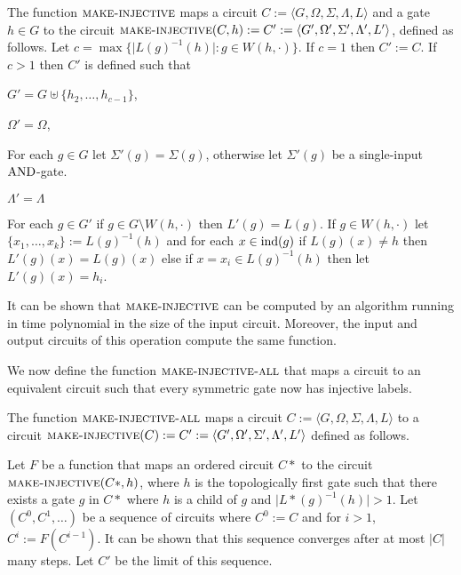 \documentclass[../paper.tex]{subfiles}
\begin{document}
\begin{definition}
  \label{def:make-injective}
  The function ${\normalfont\textsc{make-injective}}$ maps a circuit $C := \langle G, \Omega,
  \Sigma , \Lambda, L \rangle$ and a gate $h \in G$ to the circuit
  ${\normalfont\textsc{make-injective}}(C, h) := C' := \langle G', \Omega', \Sigma', \Lambda', L'
  \rangle$, defined as follows. Let $c = \max \{\vert L(g)^{-1}(h)\vert : g \in
  W(h, \cdot)\}$. If $c = 1$ then $C' := C$. If $c > 1$ then $C'$ is defined
  such that
  \begin{itemizens}
  \item $G' = G \uplus \{h_2, \ldots, h_{c-1}\}$,
  \item $\Omega' = \Omega$,
  \item For each $g \in G$ let $\Sigma' (g) = \Sigma(g)$, otherwise let
    $\Sigma'(g)$ be a single-input $\text{\upshape AND}$-gate.
  \item $\Lambda'= \Lambda$
  \item For each $g \in G'$ if $g \in G \setminus W(h, \cdot)$ then $L'(g) =
    L(g)$. If $g \in W(h, \cdot)$ let $\{x_1, \ldots, x_k\} := L(g)^{-1}(h)$ and
    for each $x \in \text{\upshape ind}(g)$ if $L(g)(x) \neq h$ then $L'(g)(x) = L(g)(x)$ else
    if $x = x_i \in L(g)^{-1}(h)$ then let $L'(g)(x) = h_i$.
  \end{itemizens}
\end{definition}

It can be shown that ${\normalfont\textsc{make-injective}}$ can be computed by an algorithm
running in time polynomial in the size of the input circuit. Moreover, the input
and output circuits of this operation compute the same function.

We now define the function ${\normalfont\textsc{make-injective-all}}$ that maps a circuit to an
equivalent circuit such that every symmetric gate now has injective labels.

\begin{definition}
  The function ${\normalfont\textsc{make-injective-all}}$ maps a circuit $C := \langle G, \Omega,
  \Sigma , \Lambda, L \rangle$ to a circuit ${\normalfont\textsc{make-injective}}(C) := C' :=
  \langle G', \Omega', \Sigma', \Lambda', L' \rangle$ defined as follows.

  Let $F$ be a function that maps an ordered circuit $C*$ to the circuit
  ${\normalfont\textsc{make-injective}}(C*, h)$, where $h$ is the topologically first gate such
  that there exists a gate $g$ in $C*$ where $h$ is a child of $g$ and $\vert
  L*(g)^{-1}(h) \vert > 1$. Let $(C^0, C^1, \ldots)$ be a sequence of circuits
  where $C^0 := C$ and for $i > 1$, $C^i := F(C^{i-1})$. It can be shown that
  this sequence converges after at most $\vert C \vert$ many steps. Let $C'$ be
  the limit of this sequence.
\end{definition}
\end{document}
